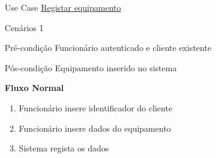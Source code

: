 \documentclass[../relatorio.tex]{subfiles}
\begin{document}
\begin{itemize}
    \item[Use Case] {\underline{Registar equipamento}}
    \item[Cenários] {1}
    \item[Pré-condição] {Funcionário autenticado e cliente existente}
    \item[Pós-condição] {Equipamento inserido no sistema}
          \begin{flushleft}
              \textbf{Fluxo Normal}
          \end{flushleft}
          \begin{enumerate}
              \item Funcionário insere identificador do cliente
              \item Funcionário insere dados do equipamento
              \item Sistema regista os dados
          \end{enumerate}
\end{itemize}
\end{document}

